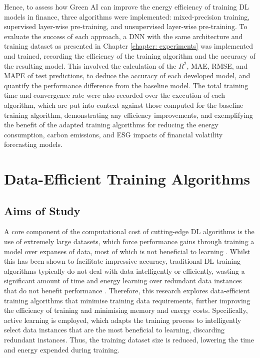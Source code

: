 \documentclass[a4paper, 11pt]{report}
\begin{document}
    Hence, to assess how Green AI can improve the energy efficiency of training DL models in finance, three algorithms were implemented: mixed-precision training, supervised layer-wise pre-training, and unsupervised layer-wise pre-training. To evaluate the success of each approach, a DNN with the same architecture and training dataset as presented in Chapter \ref{chapter: experiments} was implemented and trained, recording the efficiency of the training algorithm and the accuracy of the resulting model. This involved the calculation of the $R^2$, MAE, RMSE, and MAPE of test predictions, to deduce the accuracy of each developed model, and quantify the performance difference from the baseline model. The total training time and convergence rate were also recorded over the execution of each algorithm, which are put into context against those computed for the baseline training algorithm, demonstrating any efficiency improvements, and exemplifying the benefit of the adapted training algorithms for reducing the energy consumption, carbon emissions, and ESG impacts of financial volatility forecasting models.


    \chapter{Data-Efficient Training Algorithms}
    \label{chapter: data-extensions}

    \section{Aims of Study}

    A core component of the computational cost of cutting-edge DL algorithms is the use of extremely large datasets, which force performance gains through training a model over expanses of data, most of which is not beneficial to learning \citep{bender-2021}. Whilst this has been shown to facilitate impressive accuracy, traditional DL training algorithms typically do not deal with data intelligently or efficiently, wasting a significant amount of time and energy learning over redundant data instances that do not benefit performance \citep{aljarrah-2015}. Therefore, this research explores data-efficient training algorithms that minimise training data requirements, further improving the efficiency of training and minimising memory and energy costs. Specifically, active learning is employed, which adapts the training process to intelligently select data instances that are the most beneficial to learning, discarding redundant instances. Thus, the training dataset size is reduced, lowering the time and energy expended during training. 
\end{document}
